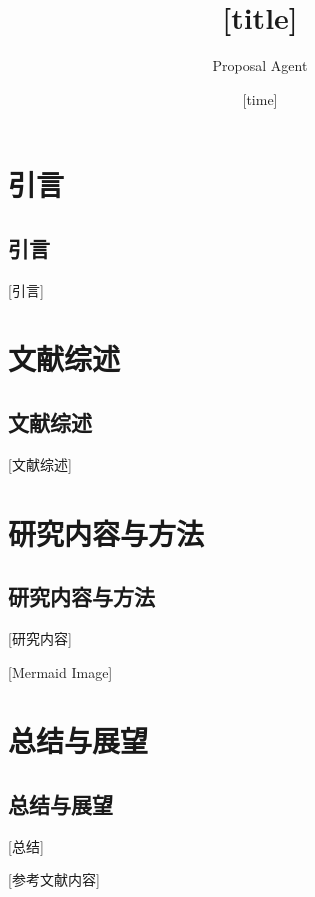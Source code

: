 \documentclass{phdproposal}
\title{[title]}
\author{Proposal Agent}
\date{[time]}
\begin{document}
\frontmatter

\maketitle

\clearpage
{}

\maketoc[nopagenum]

\clearpage
{}

\mainmatter


\chapter{引言}
\section{引言}

[引言]

\chapter{文献综述}
\section{文献综述}

[文献综述]

\chapter{研究内容与方法}
\section{研究内容与方法}

[研究内容]


[Mermaid Image]

\chapter{总结与展望}
\section{总结与展望}

[总结]




\backmatter


[参考文献内容]
% 
% 
\end{document}

